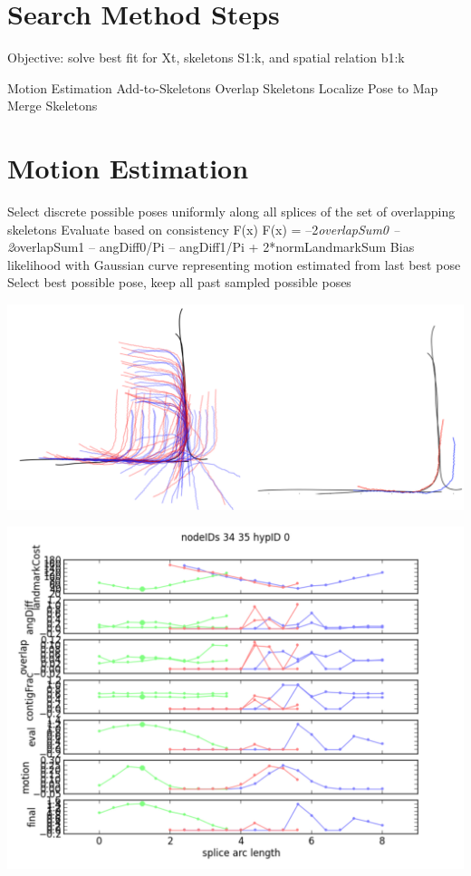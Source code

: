 \section{Search Method Steps}
\label{searchmethodsteps}

Objective: solve best fit for Xt, skeletons S1:k, and spatial relation b1:k

Motion Estimation
Add-to-Skeletons
Overlap Skeletons
Localize Pose to Map
Merge Skeletons

\section{Motion Estimation}
\label{motionestimation}

Select discrete possible poses uniformly along all splices of the set of overlapping skeletons
Evaluate based on consistency F(x)
F(x) = --2\emph{overlapSum0 – 2}overlapSum1 – angDiff0\slash Pi – angDiff1\slash Pi + 2*normLandmarkSum
Bias likelihood with Gaussian curve representing motion estimated from last best pose
Select best possible pose, keep all past sampled possible poses

\includegraphics[keepaspectratio,width=\textwidth,height=0.75\textheight]{PastedGraphic9.pdf}

\includegraphics[keepaspectratio,width=\textwidth,height=0.75\textheight]{PastedGraphic10.pdf}



